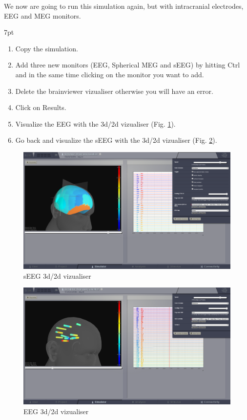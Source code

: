 \documentclass{tufte-handout}
\newenvironment{simulation}{%
  \def\FrameCommand{%
    \hspace{1pt}%
    {\color{ForestGreen}\vrule width 2pt}%
    {\color{simulationshade}\vrule width 4pt}%
    \colorbox{simulationshade}%
  }%
  \MakeFramed{\advance\hsize-\width\FrameRestore}%
  \noindent\hspace{-4.55pt}%
  \begin{adjustwidth}{}{7pt}%
  \vspace{2pt}\vspace{2pt}%
}
{%
  \vspace{2pt}\end{adjustwidth}\endMakeFramed%
}
\begin{document}
We now are going to run this simulation again, but with intracranial electrodes, EEG and MEG monitors.

\begin{simulation}
  \begin{enumerate}
  \item Copy the simulation.
  \item Add three new monitors (EEG, Spherical MEG and sEEG) by hitting Ctrl and in the same time clicking on the monitor
  you want to add.
  \item Delete the brainviewer vizualiser otherwise you will have an error.
  \item Click on Results.
  \item Visualize the EEG with the 3d/2d vizualiser (Fig. \ref{fig:sEEG}).
  \item Go back and visualize the sEEG with the 3d/2d vizualiser (Fig. \ref{fig:EEG}).
\end{enumerate}
\end{simulation}

\begin{figure}[h]
  \includegraphics[width=\linewidth]{Handout_UI_ModellingAnEpilepticPatient_EEG3d2dBrainVizualiser}%
  \caption{sEEG 3d/2d vizualiser}%
  \label{fig:sEEG}%
\end{figure}

\begin{figure}[h]
  \includegraphics[width=\linewidth]{Handout_UI_ModellingAnEpilepticPatient_sEEG3d2dBrainVizualiser}%
  \caption{EEG 3d/2d vizualiser}%
  \label{fig:EEG}%
\end{figure}
\end{document}

